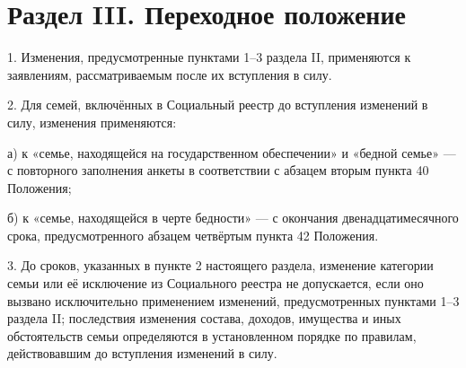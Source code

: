 \documentclass[14pt,a4paper]{extarticle}
\newcommand{\norm}[1]{\par\noindent\hspace*{1.27cm}#1. }
\newcommand{\sub}[1]{\par\noindent\hspace*{1.27cm}#1 }
\begin{document}
\section*{Раздел III. Переходное положение}

\norm{1}Изменения, предусмотренные пунктами 1–3 раздела II, применяются к заявлениям, рассматриваемым после их вступления в силу.

\norm{2}Для семей, включённых в Социальный реестр до вступления изменений в силу, изменения применяются:
\sub{а)}к «семье, находящейся на государственном обеспечении» и «бедной семье» — с повторного заполнения анкеты в соответствии с абзацем вторым пункта 40 Положения;
\sub{б)}к «семье, находящейся в черте бедности» — с окончания двенадцатимесячного срока, предусмотренного абзацем четвёртым пункта 42 Положения.

\norm{3}До сроков, указанных в пункте 2 настоящего раздела, изменение категории семьи или её исключение из Социального реестра не допускается, если оно вызвано исключительно применением изменений, предусмотренных пунктами 1–3 раздела II; последствия изменения состава, доходов, имущества и иных обстоятельств семьи определяются в установленном порядке по правилам, действовавшим до вступления изменений в силу.
\end{document}
